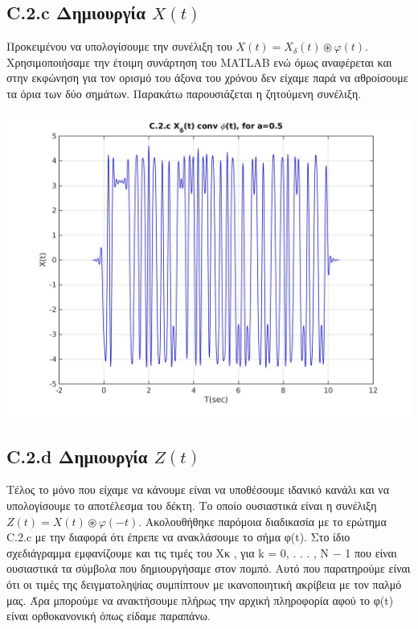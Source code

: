 \documentclass[11pt]{article}
\begin{document}
    \subsection*{C.2.c Δημιουργία $X(t)$}
    Προκειμένου να υπολογίσουμε την συνέλιξη του $X(t) = X_δ (t) \circledast  φ(t)$. Χρησιμοποιήσαμε την έτοιμη συνάρτηση του MATLAB ενώ όμως αναφέρεται και στην εκφώνηση για τον ορισμό του άξονα του χρόνου δεν είχαμε παρά να αθροίσουμε τα όρια των δύο σημάτων. Παρακάτω παρουσιάζεται η ζητούμενη συνέλιξη.
    
    \begin{center}
        \includegraphics[scale=0.35]{photos/C.2.c X(t).jpg}
    \end{center} 
    
    \subsection*{C.2.d Δημιουργία $Z(t)$}
    Τέλος το μόνο που είχαμε να κάνουμε είναι να υποθέσουμε ιδανικό κανάλι και να υπολογίσουμε το αποτέλεσμα του δέκτη. Το οποίο ουσιαστικά είναι η συνέλιξη $Z(t) = X(t) \circledast φ(−t)$. Ακολουθήθηκε παρόμοια διαδικασία με το ερώτημα C.2.c με την διαφορά ότι έπρεπε να ανακλάσουμε το σήμα φ(t). Στο ίδιο σχεδιάγραμμα εμφανίζουμε και τις τιμές του Χκ , για k = 0, . . . , N − 1 που είναι ουσιαστικά τα σύμβολα που δημιουργήσαμε στον πομπό. Αυτό που παρατηρούμε είναι ότι οι τιμές της δειγματοληψίας συμπίπτουν με ικανοποιητική ακρίβεια με τον παλμό μας. Άρα μπορούμε να ανακτήσουμε πλήρως την αρχική πληροφορία αφού το φ(t) είναι ορθοκανονική όπως είδαμε παραπάνω.
    
\end{document}

